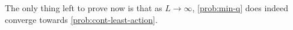 The only thing left to prove now is that as $L \rightarrow \infty$, \cref{prob:min-q} does indeed converge towards \cref{prob:cont-least-action}.


